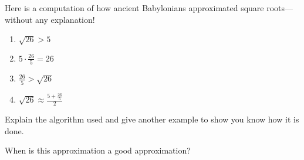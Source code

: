 \documentclass[handout,newpage]{ximera}
\begin{document}
\begin{question}
Here is a computation of how ancient Babylonians approximated square
roots---without any explanation!
\begin{enumerate}
\item $\sqrt{26}> 5$
\item $5 \cdot \frac{26}{5} = 26$
\item $\frac{26}{5}> \sqrt{26}$
\item $\sqrt{26}\approx \frac{5+\frac{26}{5}}{2}$
\end{enumerate}
Explain the algorithm used and give another example to show you know how it
is done.
\end{question}

\begin{exploration}
When is this approximation a good approximation?
\end{exploration}
\end{document}
